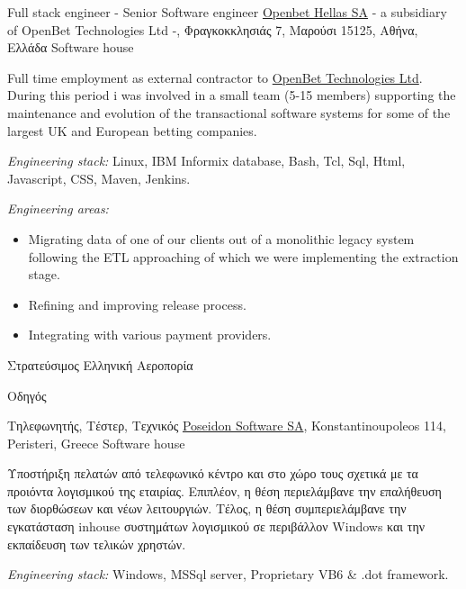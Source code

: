 \documentclass[arial, greek, nologo, notitle, totpages]{europecv2013}
\begin{document}
\begin{europecv}
	{\foreignlanguage{english}{Full stack engineer - Senior Software engineer}}
    {\foreignlanguage{english}{\href{http://www.openbet.com}{Openbet Hellas SA} - a subsidiary of OpenBet Technologies Ltd} -, Φραγκοκκλησιάς 7, Μαρούσι 15125, Αθήνα, Ελλάδα}
    {\foreignlanguage{english}{Software house}}
    {
   	\begin{small}
    	Full time employment as external contractor to \href{http://www.openbet.com}{OpenBet Technologies Ltd}. During this period i was involved in a small team (5-15 members) supporting the maintenance and evolution of the transactional software systems for some of the largest UK and European betting companies.
        \begin{flushleft}
        	\textit{Engineering stack:} Linux, IBM Informix database, Bash, Tcl, Sql, Html, Javascript, CSS, Maven, Jenkins.
        \end{flushleft}
		\textit{Engineering areas:}
		\begin{itemize}[label=\raisebox{0.25ex}{\tiny$\bullet$}, leftmargin=+1.0cm]
    		\item Migrating data of one of our clients out of a monolithic legacy system following the ETL approaching of which we were implementing the extraction stage.
			\item Refining and improving release process.
			\item Integrating with various payment providers.
		\end{itemize}
    \end{small}
	}

	{Στρατεύσιμος}
    {Ελληνική Αεροπορία}
    {
	\begin{small}
    	Οδηγός
	\end{small}
    }

	{Τηλεφωνητής, Τέστερ, Τεχνικός}
    {\href{http://www.poseidon.gr}{\foreignlanguage{english}{Poseidon Software SA}}, \foreignlanguage{english}{Konstantinoupoleos 114, Peristeri, Greece}}
    {\foreignlanguage{english}{Software house}}
    {
    \begin{small}
    	Υποστήριξη πελατών από τελεφωνικό κέντρο και στο χώρο τους σχετικά με τα προιόντα λογισμικού της εταιρίας. Επιπλέον, η θέση περιελάμβανε την επαλήθευση των διορθώσεων και νέων λειτουργιών. Τέλος, η θέση συμπεριελάμβανε την εγκατάσταση inhouse συστημάτων λογισμικού σε περιβάλλον \foreignlanguage{english}{Windows} και την εκπαίδευση των τελικών χρηστών.
		\begin{flushleft}
			\foreignlanguage{english}{\textit{Engineering stack:} Windows, MSSql server, Proprietary VB6 \& .dot framework.}
        \end{flushleft}
    \end{small}
	}


\end{europecv}
\end{document}
